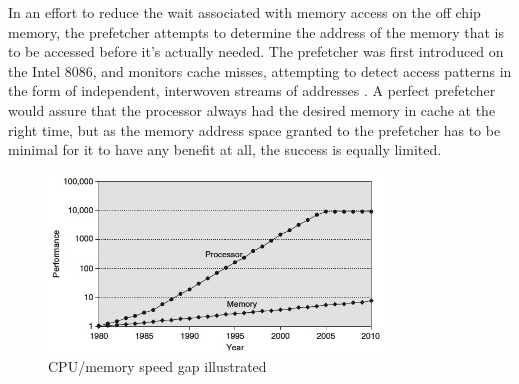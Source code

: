 In an effort to reduce the wait associated with memory access on the off chip memory, the prefetcher attempts to determine the address of the memory that is to be accessed before it's actually needed. The prefetcher was first introduced on the Intel 8086, and monitors cache misses, attempting to detect access patterns in the form of independent, interwoven streams of addresses \cite{reference:8086}. A perfect prefetcher would assure that the processor always had the desired memory in cache at the right time, but as the memory address space granted to the prefetcher has to be minimal for it to have any benefit at all, the success is equally limited.\\
\begin{figure}[h!]
	\includegraphics[width=3.5in]{graphics/CPUmemoryGap.jpg}
	\caption{CPU/memory speed gap illustrated}
	\label{graph:cpugap}
\end{figure}
\\

